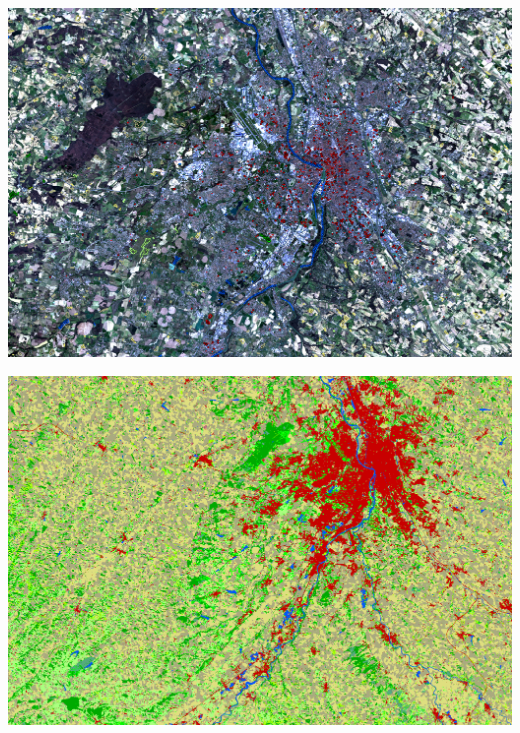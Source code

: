 \documentclass[8pt]{beamer}
\begin{document}
\vspace*{-6.5mm}
\begin{frame}[plain]
\hspace*{-11mm}
    \includegraphics[keepaspectratio,height=1.1\paperheight]{../../Courses/org/WorkshopGuide/Images/samples_selection.png}
\end{frame}


\vspace*{-6.5mm}
\begin{frame}[plain]
\hspace*{-11mm}
    \includegraphics[keepaspectratio,height=1.1\paperheight]{../../Courses/org/WorkshopGuide/Images/final_classification.png}
\end{frame}
\end{document}
